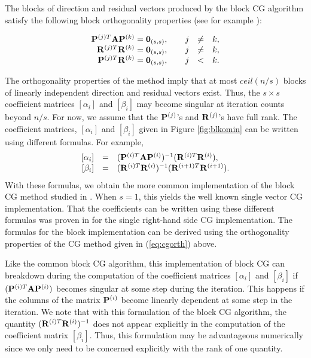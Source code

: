 \documentclass[twoside]{siamltex}
\newcommand{\bA}{{\bf A}}
\newcommand{\bP}{{\bf P}}
\newcommand{\bR}{{\bf R}}
\newcommand{\dm}{\begin{displaymath}}
\newcommand{\edm}{\end{displaymath}}
\newcommand{\eq}{\begin{equation}}
\newcommand{\eeq}{\end{equation}}
\begin{document}
The blocks of direction and residual vectors produced by the block
CG algorithm satisfy the following block orthogonality properties
(see for example \cite{Ol80}):

 \eq
 \begin{array}{rcl}
  \bP^{(j)T} \bA \bP^{(k)} = {\bf 0}_{(s,s)}, \qquad j &\ne& k, \\
  \bR^{(j)T} \bR^{(k)} = {\bf 0}_{(s,s)}, \qquad j &\ne& k, \\
  \bP^{(j)T} \bR^{(k)} = {\bf 0}_{(s,s)}, \qquad j &<& k.
  \end{array}
  \label{eq:cgorth}
  \eeq

The orthogonality properties of the method imply that at most
$ceil(n/s)$ blocks of linearly independent direction and residual
vectors exist. Thus, the $s \times s$ coefficient matrices
$[\alpha_i]$ and $[\beta_i]$ may become singular at iteration
counts beyond $n/s$. For now, we assume that the $\bP^{(j)}$'s and
$\bR^{(j)}$'s have full rank. The coefficient matrices,
$[\alpha_i]$ and $[\beta_i]$ given in Figure \ref{fig:blkomin} can
be written using different formulas. For example,
 \dm
 \begin{array}{rcl}
  \left[ \alpha_i \right] &=& ( \bP^{(i)T} \bA \bP^{(i)} )^{-1} ( \bR^{(i)T}
  \bR^{(i)} ), \\
  \left[ \beta_i \right] &=& ( \bR^{(i)T} \bR^{(i)} )^{-1} ( \bR^{(i+1)T}
  \bR^{(i+1)} ).
  \end{array}
 \edm
With these formulas, we obtain the more common implementation of
the block CG method studied in \cite{Ol80}. When $s=1$, this
yields the well known single vector CG implementation. That the
coefficients can be written using these different formulas was
proven in \cite{HS52} for the single right-hand side CG
implementation. The formulas for the block implementation can be
derived using the orthogonality properties of the CG method given
in (\ref{eq:cgorth}) above.

Like the common block CG algorithm, this implementation of block
CG can breakdown during the computation of the coefficient
matrices $[\alpha_i]$ and $[\beta_i]$ if $(\bP^{(i)T} \bA
\bP^{(i)})$ becomes singular at some step during the iteration.
This happens if the columns of the matrix $\bP^{(i)}$ become
linearly dependent at some step in the iteration. We note that
with this formulation of the block CG algorithm, the quantity
$(\bR^{(i)T} \bR^{(i)})^{-1}$ does not appear explicitly in the
computation of the coefficient matrix $[\beta_i]$. Thus, this
formulation may be advantageous numerically since we only need to
be concerned explicitly with the rank of one quantity.
\end{document}
